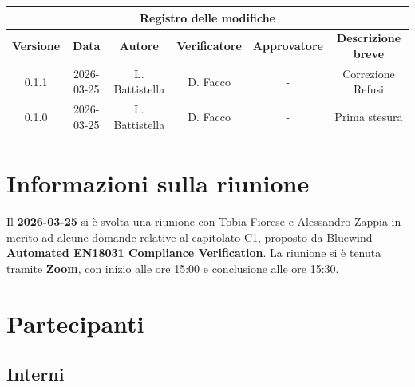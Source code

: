 \documentclass[a4paper, 10pt, colorlinks=true, linkcolor=black, urlcolor=blue, citecolor=blue, hidelinks]{article}
\begin{document}
\newcommand{\tipoverbale}{esterno}
\newcommand{\dataverbale}{2026-03-25}
\newcommand{\dataversione}{2026-03-25}
\newcommand{\versione}{0.1.0}
\newcommand{\stato}{Revisionato}
\newcommand{\destinatari}{The Bitless, prof. T. Vardanega, prof. R. Cardin, Bluewind}




\newpage

\begin{center}
    \thispagestyle{empty}
                \begin{tabular}{|c|c|c|c|c|c|}
                    \hline
                    \multicolumn{6}{|c|}{\textbf{Registro delle modifiche}} \\
                    \hline
                    \textbf{Versione} & \textbf{Data} & \textbf{Autore}  & \textbf{Verificatore} & \textbf{Approvatore} & \textbf{Descrizione breve} \\
                    \hline
                    0.1.1 & 2026-03-25 & L. Battistella & D. Facco & - & Correzione Refusi \\
                    \hline
                    0.1.0 & 2026-03-25 & L. Battistella &  D. Facco  & - & Prima stesura \\
                    \hline
                \end{tabular}
\end{center}

\newpage

\tableofcontents


\newpage
\section{Informazioni sulla riunione}
Il \textbf{2026-03-25} si è svolta una riunione con Tobia Fiorese e Alessandro Zappia in merito ad alcune domande relative al capitolato C1, proposto da Bluewind \textbf{Automated EN18031 Compliance Verification}. La riunione si è tenuta tramite \textbf{Zoom}, con inizio alle ore 15:00 e conclusione alle ore 15:30.

\section{Partecipanti}

\subsection{Interni}
\end{document}
